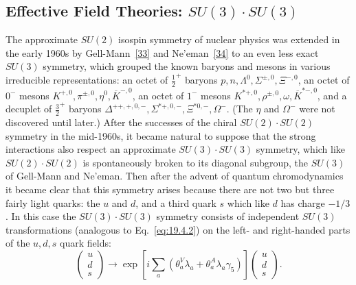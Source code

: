 
\subsection{\texorpdfstring{Effective Field Theories: $SU(3)\cdot SU(3)$}{Effective Field Theories: SU(3) . SU(3)}}
\label{sec:19.7}

The approximate $SU(2)$ isospin symmetry of nuclear physics was extended in the early 1960s by Gell-Mann~\hyperref[ch19-ref-33]{[33]} and Ne'eman~\hyperref[ch19-ref-34]{[34]} to an even less exact $SU(3)$ symmetry, which grouped the known baryons and mesons in various irreducible representations: an octet of $\frac{1}{2}^+$ baryons $p,n,\Lambda^0,\Sigma^{\pm,0},\allowbreak\Xi^{-,0}$, an octet of $0^-$ mesons $K^{+,0},\pi^{\pm,0},\eta^0,\allowbreak\overline K^{-,0}$, an octet of $1^-$ mesons $K^{*+,0},\rho^{\pm,0},\omega,\allowbreak\overline K^{*-,0}$, and a decuplet of $\frac{3}{2}^+$ baryons $\Delta^{++,+,0,-},\Sigma^{*+,0,-},\allowbreak\Xi^{*0,-},\Omega^-$. (The $\eta$ and $\Omega^-$ were not discovered until later.) After the successes of the chiral $SU(2)\cdot SU(2)$ symmetry in the mid-1960s, it became natural to suppose that the strong interactions also respect an approximate $SU(3)\cdot SU(3)$ symmetry, which like $SU(2)\cdot SU(2)$ is spontaneously broken to its diagonal subgroup, the $SU(3)$ of Gell-Mann and Ne'eman. Then after the advent of quantum chromodynamics it became clear that this symmetry arises because there are not two but three fairly light quarks: the $u$ and $d$, and a third quark $s$ which like $d$ has charge $-1/3$. In this case the $SU(3)\cdot SU(3)$ symmetry consists of independent $SU(3)$ transformations (analogous to Eq.~\eqref{eq:19.4.2}) on the left- and right-handed parts of the $u,d,s$ quark fields:
\begin{equation}
\begin{pmatrix}u\\d\\s\end{pmatrix}
\longrightarrow
\exp\left[i\sum_a\left(\theta_a^V\lambda_a+
\theta_a^A\lambda_a\gamma_5\right)\right]
\begin{pmatrix}u\\d\\s\end{pmatrix}.
\tag{19.7.1}\label{eq:19.7.1}
\end{equation}
